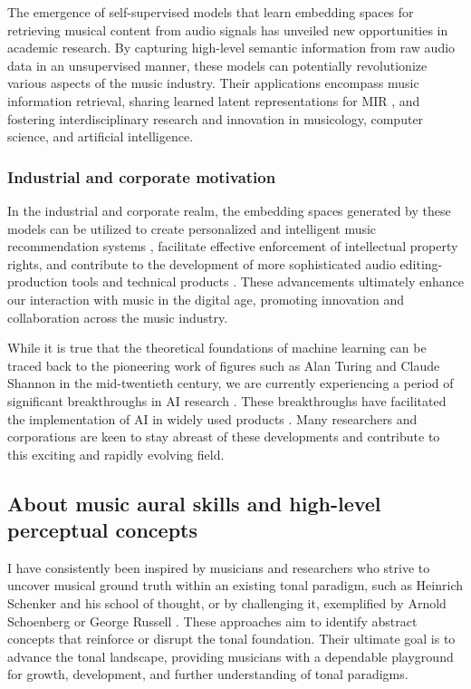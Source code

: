 The emergence of self-supervised models that learn embedding spaces for retrieving musical content from audio signals has unveiled new opportunities in academic research. By capturing high-level semantic information from raw audio data in an unsupervised manner, these models can potentially revolutionize various aspects of the music industry. Their applications encompass music information retrieval, sharing learned latent representations for MIR \cite{HamelTransferSimilarity}, and fostering interdisciplinary research and innovation in musicology, computer science, and artificial intelligence.

\subsubsection{Industrial and corporate motivation}

In the industrial and corporate realm, the embedding spaces generated by these models can be utilized to create personalized and intelligent music recommendation systems \cite{Chen2020LearningRecommendation}\cite{epidemic}, facilitate effective enforcement of intellectual property rights, and contribute to the development of more sophisticated audio editing-production tools and technical products \cite{WonEmotionStories}. These advancements ultimately enhance our interaction with music in the digital age, promoting innovation and collaboration across the music industry.

While it is true that the theoretical foundations of machine learning can be traced back to the pioneering work of figures such as Alan Turing and Claude Shannon in the mid-twentieth century, we are currently experiencing a period of significant breakthroughs in AI research \cite{Vaswani2017AttentionNeed}. These breakthroughs have facilitated the implementation of AI in widely used products \cite{OpenAI2023GPT-4Report}. Many researchers and corporations are keen to stay abreast of these developments and contribute to this exciting and rapidly evolving field.

\subsection{About music aural skills and high-level perceptual concepts}

I have consistently been inspired by musicians and researchers who strive to uncover musical ground truth within an existing tonal paradigm, such as Heinrich Schenker and his school of thought, or by challenging it, exemplified by Arnold Schoenberg or George Russell \cite{LydianRussell}. These approaches aim to identify abstract concepts that reinforce or disrupt the tonal foundation. Their ultimate goal is to advance the tonal landscape, providing musicians with a dependable playground for growth, development, and further understanding of tonal paradigms.


